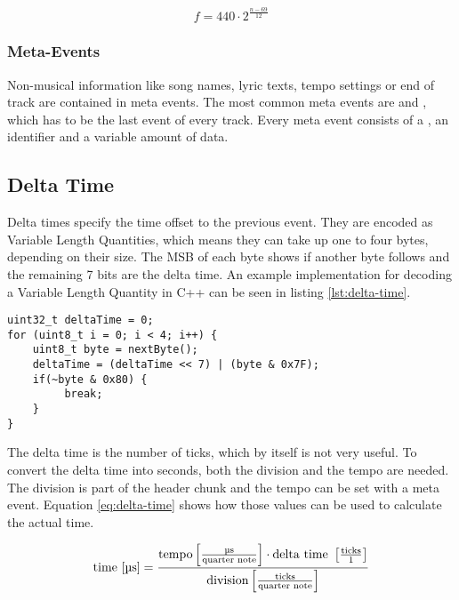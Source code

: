 \begin{equation}\label{eq:note-number}
    f = 440 \cdot 2^{\frac{n - 69}{12}}
\end{equation}

\subsubsection{Meta-Events}

Non-musical information like song names, lyric texts, tempo settings or end of track are contained in meta events. The most common meta events are  and , which has to be the last event of every track. Every meta event consists of a , an identifier and a variable amount of data.

\subsection{Delta Time}

Delta times specify the time offset to the previous event. They are encoded as Variable Length Quantities, which means they can take up one to four bytes, depending on their size. The MSB %
of each byte shows if another byte follows and the remaining 7 bits are the delta time. An example implementation for decoding a Variable Length Quantity in C++ can be seen in listing \ref{lst:delta-time}.

\begin{lstlisting}[caption=Decoding the Delta Time, label=lst:delta-time]
uint32_t deltaTime = 0;
for (uint8_t i = 0; i < 4; i++) {
    uint8_t byte = nextByte();
    deltaTime = (deltaTime << 7) | (byte & 0x7F);
    if(~byte & 0x80) {
         break;
    }
}
\end{lstlisting}

The delta time is the number of ticks, which by itself is not very useful. To convert the delta time into seconds, both the division and the tempo are needed. The division is part of the header chunk and the tempo can be set with a meta event. Equation \ref{eq:delta-time} shows how those values can be used to calculate the actual time.

\begin{equation}\label{eq:delta-time}
    \textnormal{time [\textmu s]} = \frac{{\textnormal{tempo} \left[ \frac{\textnormal{\textmu s}}{\textnormal{quarter note}} \right] \cdot \textnormal{delta time } \left[\frac{\textnormal{ticks}}{1}\right]}}{\textnormal{division}  \left[ \frac{\textnormal{ticks}}{\textnormal{quarter note}} \right]}
\end{equation}

